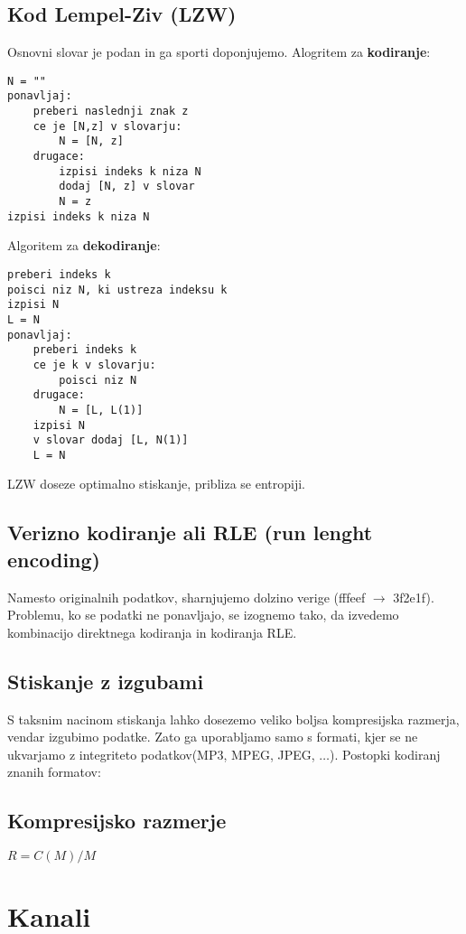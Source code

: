 \documentclass{article}
\begin{document}
\begin{multicols}{4}
\subsection{Kod Lempel-Ziv (LZW)}
Osnovni slovar je podan in ga sporti doponjujemo. Alogritem za \textbf{kodiranje}:
\begin{verbatim}
N = ""
ponavljaj:
    preberi naslednji znak z
    ce je [N,z] v slovarju:
        N = [N, z]
    drugace:
        izpisi indeks k niza N
        dodaj [N, z] v slovar
        N = z
izpisi indeks k niza N
\end{verbatim}
Algoritem za \textbf{dekodiranje}:
\begin{verbatim}
preberi indeks k
poisci niz N, ki ustreza indeksu k
izpisi N
L = N
ponavljaj:
    preberi indeks k
    ce je k v slovarju:
        poisci niz N
    drugace:
        N = [L, L(1)]
    izpisi N
    v slovar dodaj [L, N(1)]
    L = N
\end{verbatim}
LZW doseze optimalno stiskanje, pribliza se entropiji. %

\subsection{Verizno kodiranje ali RLE (run lenght encoding)} 
Namesto originalnih podatkov, sharnjujemo dolzino verige (fffeef $\rightarrow$ 3f2e1f).
Problemu, ko se podatki ne ponavljajo, se izognemo tako, da izvedemo kombinacijo direktnega kodiranja
in kodiranja RLE. %

\subsection{Stiskanje z izgubami}
S taksnim nacinom stiskanja lahko dosezemo veliko boljsa kompresijska razmerja, vendar izgubimo podatke.
Zato ga uporabljamo samo s formati, kjer se ne ukvarjamo z integriteto podatkov(MP3, MPEG, JPEG, $\dots$).
Postopki kodiranj znanih formatov:

\subsection{Kompresijsko razmerje}
\begin{center}
    \begin{math}
        R = C(M) / M
    \end{math}
\end{center}

\section{Kanali}


\end{multicols}
\end{document}
